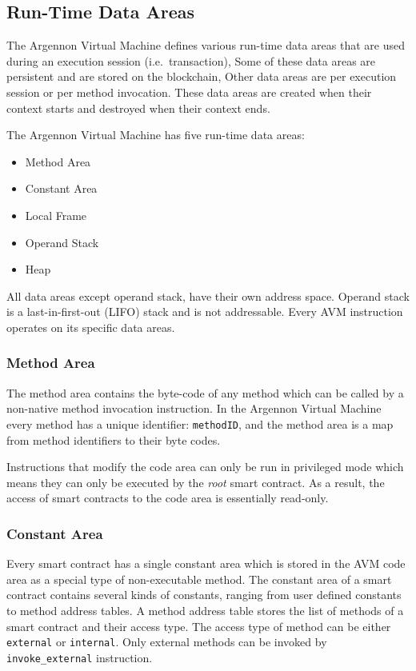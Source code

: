 \documentclass[11pt, a4paper]{report}
\begin{document}
    \subsection{Run-Time Data Areas}\label{subsec:data-areas}

    The Argennon Virtual Machine defines various run-time data areas that are used during an execution session
    (i.e.\ transaction), Some of these data areas are persistent and are stored on the blockchain, Other data areas
    are per execution session or per method invocation. These data areas are created when their context starts and
    destroyed when their context ends.

    The Argennon Virtual Machine has five run-time data areas:
    \begin{itemize}
        \item Method Area
        \item Constant Area
        \item Local Frame
        \item Operand Stack
        \item Heap
    \end{itemize}
    All data areas except operand stack, have their own address space. Operand stack is a
    last-in-first-out (LIFO) stack and is not addressable. Every AVM instruction operates on its specific
    data areas.

    \subsubsection{Method Area}

    The method area contains the byte-code of any method which can be called by a non-native method invocation
    instruction. In the Argennon Virtual Machine every method has a unique identifier:
    \texttt{methodID}, and the method area is a map from method identifiers to their byte codes.

    Instructions that modify the code area can only be run in privileged mode which means they can only be executed
    by the \emph{root} smart contract. As a result, the access of smart contracts to the code area is essentially
    read-only.

    \subsubsection{Constant Area}

    Every smart contract has a single constant area which is stored in the AVM code area as a special type of
    non-executable method. The constant area of a smart contract contains several kinds of constants, ranging from user
    defined constants to method address tables. A method address table stores the list of methods of a smart
    contract and their access type. The access type of method can be either \texttt{external} or \texttt{internal}.
    Only external methods can be invoked by \texttt{invoke\_external} instruction.
\end{document}
